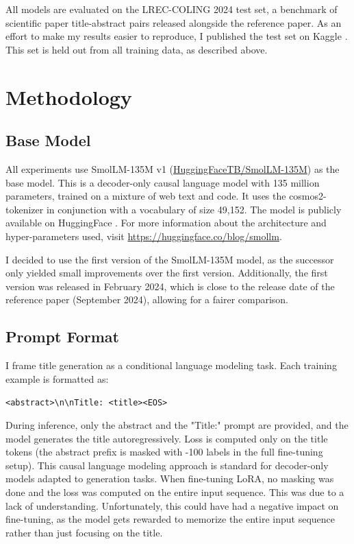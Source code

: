 \documentclass[12pt,conference]{IEEEtran}
\begin{document}
All models are evaluated on the LREC-COLING 2024 test set, a benchmark of scientific paper title-abstract pairs released alongside the reference paper. As an effort to make my results easier to reproduce, I published the test set on Kaggle \cite{b7}. This set is held out from all training data, as described above.

\section{Methodology}

\subsection{Base Model}
All experiments use SmolLM-135M v1 (\href{https://huggingface.co/HuggingFaceTB/SmolLM-135M}{HuggingFaceTB/SmolLM-135M}) as the base model. This is a decoder-only causal language model with 135 million parameters, trained on a mixture of web text and code. It uses the cosmos2-tokenizer in conjunction with a vocabulary of size 49{,}152. The model is publicly available on HuggingFace \cite{b8}. For more information about the architecture and hyper-parameters used, visit \href{https://huggingface.co/blog/smollm}{https://huggingface.co/blog/smollm}.

I decided to use the first version of the SmolLM-135M model, as the successor only yielded small improvements over the first version. Additionally, the first version was released in February 2024, which is close to the release date of the reference paper (September 2024), allowing for a fairer comparison.

\subsection{Prompt Format}
I frame title generation as a conditional language modeling task. Each training example is formatted as:

\texttt{<abstract>\textbackslash{n}\textbackslash{n}Title: <title><EOS>}

During inference, only the abstract and the "Title:" prompt are provided, and the model generates the title autoregressively. Loss is computed only on the title tokens (the abstract prefix is masked with -100 labels in the full fine-tuning setup). This causal language modeling approach is standard for decoder-only models adapted to generation tasks. When fine-tuning LoRA, no masking was done and the loss was computed on the entire input sequence. This was due to a lack of understanding. Unfortunately, this could have had a negative impact on fine-tuning, as the model gets rewarded to memorize the entire input sequence rather than just focusing on the title. 
\end{document}
